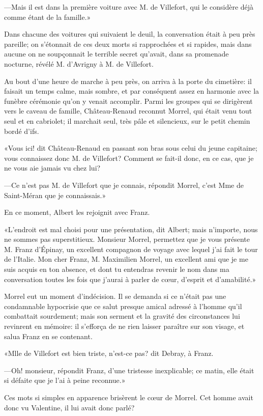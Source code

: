 —Mais il est dans la première voiture avec M. de Villefort, qui le considère déjà comme étant de la famille.» 

Dans chacune des voitures qui suivaient le deuil, la conversation était à peu près pareille; on s'étonnait de ces deux morts si rapprochées et si rapides, mais dans aucune on ne soupçonnait le terrible secret qu'avait, dans sa promenade nocturne, révélé M. d'Avrigny à M. de Villefort. 

Au bout d'une heure de marche à peu près, on arriva à la porte du cimetière: il faisait un temps calme, mais sombre, et par conséquent assez en harmonie avec la funèbre cérémonie qu'on y venait accomplir. Parmi les groupes qui se dirigèrent vers le caveau de famille, Château-Renaud reconnut Morrel, qui était venu tout seul et en cabriolet; il marchait seul, très pâle et silencieux, sur le petit chemin bordé d'ifs. 

«Vous ici! dit Château-Renaud en passant son bras sous celui du jeune capitaine; vous connaissez donc M. de Villefort? Comment se fait-il donc, en ce cas, que je ne vous aie jamais vu chez lui? 

—Ce n'est pas M. de Villefort que je connais, répondit Morrel, c'est Mme de Saint-Méran que je connaissais.» 

En ce moment, Albert les rejoignit avec Franz. 

«L'endroit est mal choisi pour une présentation, dit Albert; mais n'importe, nous ne sommes pas superstitieux. Monsieur Morrel, permettez que je vous présente M. Franz d'Épinay, un excellent compagnon de voyage avec lequel j'ai fait le tour de l'Italie. Mon cher Franz, M. Maximilien Morrel, un excellent ami que je me suis acquis en ton absence, et dont tu entendras revenir le nom dans ma conversation toutes les fois que j'aurai à parler de cœur, d'esprit et d'amabilité.» 

Morrel eut un moment d'indécision. Il se demanda si ce n'était pas une condamnable hypocrisie que ce salut presque amical adressé à l'homme qu'il combattait sourdement; mais son serment et la gravité des circonstances lui revinrent en mémoire: il s'efforça de ne rien laisser paraître sur son visage, et salua Franz en se contenant. 

«Mlle de Villefort est bien triste, n'est-ce pas? dit Debray, à Franz. 

—Oh! monsieur, répondit Franz, d'une tristesse inexplicable; ce matin, elle était si défaite que je l'ai à peine reconnue.» 

Ces mots si simples en apparence brisèrent le cœur de Morrel. Cet homme avait donc vu Valentine, il lui avait donc parlé? 

